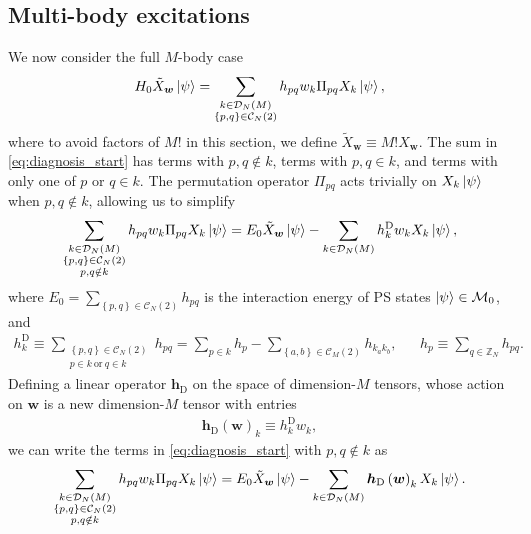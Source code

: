 \documentclass[nofootinbib,notitlepage,11pt]{revtex4-2}
\renewcommand{\t}{\text} %
\newcommand{\p}[1]{\left(#1\right)} %
\renewcommand{\set}[1]{\left\{#1\right\}} %
\newcommand{\m}{\bm} %
\newcommand{\1}{\mathds{1}}
\newcommand{\C}{\mathcal{C}}
\newcommand{\D}{\mathcal{D}}
\newcommand{\M}{\mathcal{M}}
\newcommand{\ZZ}{\mathbb{Z}}
\begin{document}
\subsection{Multi-body excitations}

We now consider the full $M$-body case
\begin{align}
  H_0 \tilde X_{\m w} \ket\psi
  = \sum_{\substack{k\in\D_N\p{M}\\\set{p,q}\in\C_N\p{2}}}
  h_{pq} w_k \Pi_{pq} X_k \ket\psi,
  \label{eq:diagnosis_start}
\end{align}
where to avoid factors of $M!$ in this section, we define
$\tilde X_{\m w}\equiv M! X_{\m w}$.  The sum in
\eqref{eq:diagnosis_start} has terms with $p,q\notin k$, terms with
$p,q\in k$, and terms with only one of $p$ or $q\in k$.  The
permutation operator $\Pi_{pq}$ acts trivially on $X_k\ket\psi$ when
$p,q\notin k$, allowing us to simplify
\begin{align}
  \sum_{\substack{k\in\D_N\p{M}\\\set{p,q}\in\C_N\p{2}\\p,q\notin k}}
  h_{pq} w_k \Pi_{pq} X_k \ket\psi
  = E_0 \tilde X_{\m w} \ket\psi
  - \sum_{k\in\D_N\p{M}} h^{\t{D}}_k w_k X_k \ket\psi,
\end{align}
where $E_0 = \sum_{\set{p,q}\in\C_N\p{2}} h_{pq}$ is the interaction
energy of PS states $\ket\psi\in\M_0$, and
\begin{align}
  h^{\t{D}}_k \equiv
  \sum_{\substack{\set{p,q}\in\C_N\p{2}\\p\in k~\t{or}~q\in k}} h_{pq}
  = \sum_{p\in k} h_p - \sum_{\set{a,b}\in\C_M\p{2}} h_{k_ak_b},
  &&
  h_p \equiv \sum_{q\in\ZZ_N} h_{pq}.
  \label{eq:multi_body_op_diag_element}
\end{align}
Defining a linear operator $\m h_{\t{D}}$ on the space of
dimension-$M$ tensors, whose action on $\m w$ is a new dimension-$M$
tensor with entries
\begin{align}
  \m h_{\t{D}}\p{\m w}_k \equiv h^{\t{D}}_k w_k,
  \label{eq:multi_body_op_diag}
\end{align}
we can write the terms in \eqref{eq:diagnosis_start} with
$p,q\notin k$ as
\begin{align}
  \sum_{\substack{k\in\D_N\p{M}\\\set{p,q}\in\C_N\p{2}\\p,q\notin k}}
  h_{pq} w_k \Pi_{pq} X_k \ket\psi
  = E_0 \tilde X_{\m w} \ket\psi
  - \sum_{k\in\D_N\p{M}} \m h_{\t{D}}\p{\m w}_k X_k \ket\psi.
\end{align}
\end{document}
